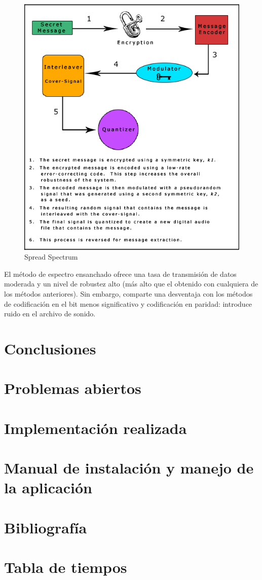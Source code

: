 \documentclass[12pt]{article}
\begin{document}
\begin{figure}
  \centering
    \includegraphics[width=\textwidth]{img/spreadspectrum}
  \caption{Spread Spectrum}
  \label{spreadspectrum}
\end{figure}

El método de espectro ensanchado ofrece una tasa de transmisión de datos moderada y un nivel de robustez alto (más alto que el obtenido con cualquiera de los métodos anteriores). Sin embargo, comparte una desventaja con los métodos de codificación en el bit menos significativo y codificación en paridad: introduce ruido en el archivo de sonido.

\section{Conclusiones}

\section{Problemas abiertos}

\section{Implementación realizada}

\section{Manual de instalación y manejo de la aplicación}

\section{Bibliografía}

\section{Tabla de tiempos}
\end{document}
